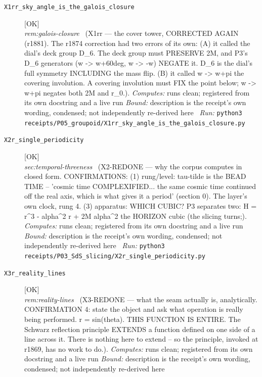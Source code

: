 \begin{description}
\item[\label{rcpt:X1rr_sky_angle_is_the_galois_closure}\texttt{X1rr\_sky\_angle\_is\_the\_galois\_closure}]\hfill\textsf{[OK]}\\
\textit{rem:galois-closure} \ (X1rr --- the cover tower, CORRECTED AGAIN (r1881). The r1874 correction had two errors of its own: (A) it called the dial's deck group D\_6. The deck group must PRESERVE 2M, and P3's D\_6 generators (w -> w+60deg, w -> -w) NEGATE it. D\_6 is the dial's full symmetry INCLUDING the mass flip. (B) it called w -> w+pi the covering involution. A covering involution must FIX the point below; w -> w+pi negates both 2M and r\_0.). 
\emph{Computes:} runs clean; registered from its own docstring and a live run
 \emph{Bound:} description is the receipt's own wording, condensed; not independently re-derived here
\ \emph{Run:} \texttt{python3 receipts/P05\_groupoid/X1rr\_sky\_angle\_is\_the\_galois\_closure.py}
\item[\label{rcpt:X2r_single_periodicity}\texttt{X2r\_single\_periodicity}]\hfill\textsf{[OK]}\\
\textit{sec:temporal-threeness} \ (X2-REDONE --- why the corpus computes in closed form. CONFIRMATIONS: (1) rung/level: tau-tilde is the BEAD TIME -- 'cosmic time COMPLEXIFIED... the same cosmic time continued off the real axis, which is what gives it a period' (section 0). The layer's own clock, rung 4. (3) apparatus: WHICH CUBIC? P3 separates two: H = r\textasciicircum{}3 - alpha\textasciicircum{}2 r + 2M alpha\textasciicircum{}2 the HORIZON cubic (the slicing turns;). 
\emph{Computes:} runs clean; registered from its own docstring and a live run
 \emph{Bound:} description is the receipt's own wording, condensed; not independently re-derived here
\ \emph{Run:} \texttt{python3 receipts/P03\_SdS\_slicing/X2r\_single\_periodicity.py}
\item[\label{rcpt:X3r_reality_lines}\texttt{X3r\_reality\_lines}]\hfill\textsf{[OK]}\\
\textit{rem:reality-lines} \ (X3-REDONE --- what the seam actually is, analytically. CONFIRMATION 4: state the object and ask what operation is really being performed. r = sin(theta). THIS FUNCTION IS ENTIRE. The Schwarz reflection principle EXTENDS a function defined on one side of a line across it. There is nothing here to extend -- so the principle, invoked at r1869, has no work to do.). 
\emph{Computes:} runs clean; registered from its own docstring and a live run
 \emph{Bound:} description is the receipt's own wording, condensed; not independently re-derived here

\end{description}
